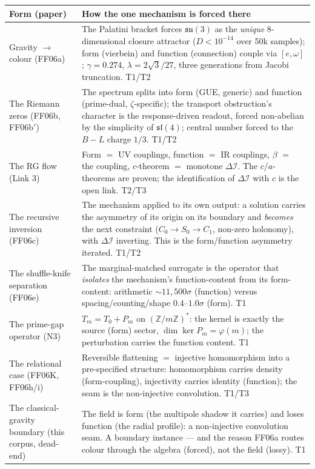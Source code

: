 \documentclass[11pt,a4paper]{article}
\newcommand{\dI}{\Delta\mathcal{I}}
\newcommand{\TT}{\textsf{T1}}
\newcommand{\Tw}{\textsf{T2}}
\newcommand{\Th}{\textsf{T3}}
\newcommand{\paper}[1]{\textsf{#1}}
\theoremstyle{definition}
\theoremstyle{plain}
\begin{document}
\begin{longtable}{p{} p{}}
\toprule
\textbf{Form (paper)} & \textbf{How the one mechanism is forced there} \\
\midrule
\endhead
Gravity $\to$ colour (\paper{FF06a}) & The Palatini bracket forces $\mathfrak{su}(3)$ as the
\emph{unique} 8-dimensional closure attractor ($D<10^{-14}$ over 50k samples); form (vierbein) and
function (connection) couple via $[e,\omega]$; $\gamma=0.274$, $\lambda=2\sqrt3/27$, three
generations from Jacobi truncation. \TT/\Tw \\
The Riemann zeros (\paper{FF06b}, \paper{FF06b$'$}) & The spectrum splits into form (GUE, generic)
and function (prime-dual, $\zeta$-specific); the transport obstruction's character is the
response-driven readout, forced non-abelian by the simplicity of $\mathfrak{sl}(4)$; central number
forced to the $B{-}L$ charge $1/3$. \TT/\Tw \\
The RG flow (Link 3) & Form $=$ UV couplings, function $=$ IR couplings, $\beta$ $=$ the coupling,
$c$-theorem $=$ monotone $\dI$. The $c$/$a$-theorems are proven; the identification of $\dI$ with $c$
is the open link. \Tw/\Th \\
The recursive inversion (\paper{FF06c}) & The mechanism applied to its own output: a solution carries
the asymmetry of its origin on its boundary and \emph{becomes} the next constraint
($C_0\to S_0\to C_1$, non-zero holonomy), with $\dI$ inverting. This is the form/function asymmetry
iterated. \TT/\Tw \\
The shuffle-knife separation (\paper{FF06e}) & The marginal-matched surrogate is the operator that
\emph{isolates} the mechanism's function-content from its form-content: arithmetic
$\sim$$11{,}500\sigma$ (function) versus spacing/counting/shape $0.4$--$1.0\sigma$ (form). \TT \\
The prime-gap operator (\paper{N3}) & $T_m=T_0+P_m$ on $(\mathbb{Z}/m\mathbb{Z})^{*}$: the kernel
is exactly the source (form) sector, $\dim\ker P_m=\varphi(m)$; the perturbation carries the function
content. \TT \\
The relational case (\paper{FF06K}, \paper{FF06h}/\paper{i}) & Reversible flattening $=$ injective
homomorphism into a pre-specified structure: homomorphism carries density (form-coupling),
injectivity carries identity (function); the seam is the non-injective convolution. \TT/\Th \\
The classical-gravity boundary (this corpus, dead-end) & The field is form (the multipole shadow it
carries) and loses function (the radial profile): a non-injective convolution seam. A boundary
instance --- and the reason \paper{FF06a} routes colour through the algebra (forced), not the field
(lossy). \TT \\
\bottomrule
\end{longtable}
\end{document}
